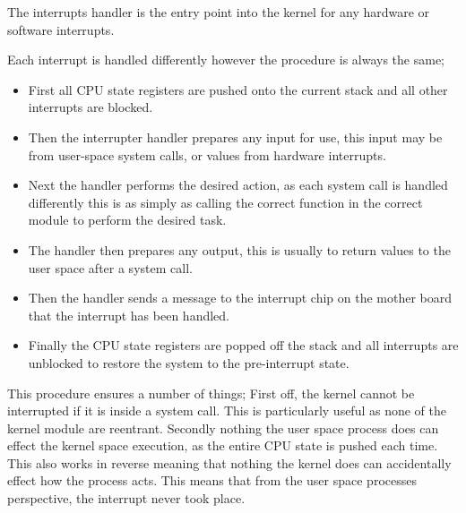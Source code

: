 \documentclass[a4paper]{report}
\begin{document}
The interrupts handler is the entry point into the kernel for any hardware or software interrupts.

Each interrupt is handled differently however the procedure is always the same;

\begin{itemize}

\item First all CPU state registers are pushed onto the current stack and all other interrupts are blocked.

\item Then the interrupter handler prepares any input for use, this input may be from user-space system calls, or values from hardware interrupts.

\item Next the handler performs the desired action, as each system call is handled differently this is as simply as calling the correct function in the correct module to perform the desired task.

\item The handler then prepares any output, this is usually to return values to the user space after a system call.

\item Then the handler sends a message to the interrupt chip on the mother board that the interrupt has been handled.

\item Finally the CPU state registers are popped off the stack and all interrupts are unblocked to restore the system to the pre-interrupt state.

\end{itemize}

This procedure ensures a number of things; First off, the kernel cannot be interrupted if it is inside a system call. This is particularly useful as none of the kernel module are reentrant. Secondly nothing the user space process does can effect the kernel space execution, as the entire CPU state is pushed each time. This also works in reverse meaning that nothing the kernel does can accidentally effect how the process acts. This means that from the user space processes perspective, the interrupt never took place.
\end{document}
